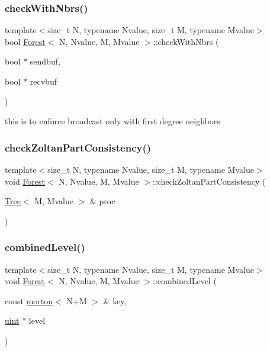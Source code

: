 \mbox{\label{classForest_a1f73446b3ae9457f2fafe44045eee589}} 
\subsubsection{\texorpdfstring{check\+With\+Nbrs()}{checkWithNbrs()}}
{\footnotesize\ttfamily template$<$size\+\_\+t N, typename Nvalue, size\+\_\+t M, typename Mvalue$>$ \\
bool \mbox{\hyperlink{classForest}{Forest}}$<$ N, Nvalue, M, Mvalue $>$\+::check\+With\+Nbrs (\begin{DoxyParamCaption}\item[{bool $\ast$}]{sendbuf,  }\item[{bool $\ast$}]{recvbuf }\end{DoxyParamCaption})}

this is to enforce broadcast only with first degree neighbors \mbox{\label{classForest_a9d43ef1507b68218e54909d9d473d168}} 
\subsubsection{\texorpdfstring{check\+Zoltan\+Part\+Consistency()}{checkZoltanPartConsistency()}}
{\footnotesize\ttfamily template$<$size\+\_\+t N, typename Nvalue, size\+\_\+t M, typename Mvalue$>$ \\
void \mbox{\hyperlink{classForest}{Forest}}$<$ N, Nvalue, M, Mvalue $>$\+::check\+Zoltan\+Part\+Consistency (\begin{DoxyParamCaption}\item[{\mbox{\hyperlink{classTree}{Tree}}$<$ M, Mvalue $>$ \&}]{proc }\end{DoxyParamCaption})}

\mbox{\label{classForest_ad1e3944cb7ce12ad68b32016fc46eb8a}} 
\subsubsection{\texorpdfstring{combined\+Level()}{combinedLevel()}}
{\footnotesize\ttfamily template$<$size\+\_\+t N, typename Nvalue, size\+\_\+t M, typename Mvalue$>$ \\
void \mbox{\hyperlink{classForest}{Forest}}$<$ N, Nvalue, M, Mvalue $>$\+::combined\+Level (\begin{DoxyParamCaption}\item[{const \mbox{\hyperlink{definitions_8h_af8682350bd8bb38ee9023f7a0a310add}{morton}}$<$ N+M $>$ \&}]{key,  }\item[{\mbox{\hyperlink{definitions_8h_a69aa29b598b851b0640aa225a9e5d61d}{uint}} $\ast$}]{level }\end{DoxyParamCaption})}

